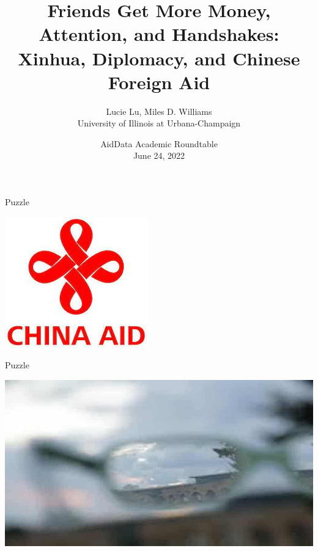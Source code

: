 \documentclass{beamer}
\title{Friends Get More Money, Attention, and Handshakes:
Xinhua, Diplomacy, and Chinese Foreign Aid}
\author{Lucie Lu, Miles D. Williams \\ University of Illinois at Urbana-Champaign}
\date {AidData Academic Roundtable \\ June 24, 2022}
\begin{document}
\maketitle

\begin{frame}{Puzzle}

\includegraphics[width=\linewidth]{china_aid_logo.jpg}
    
\end{frame}


\begin{frame}{Puzzle}

\includegraphics[width=\linewidth]{low_transparency.jpeg}

\end{frame}
\end{document}
